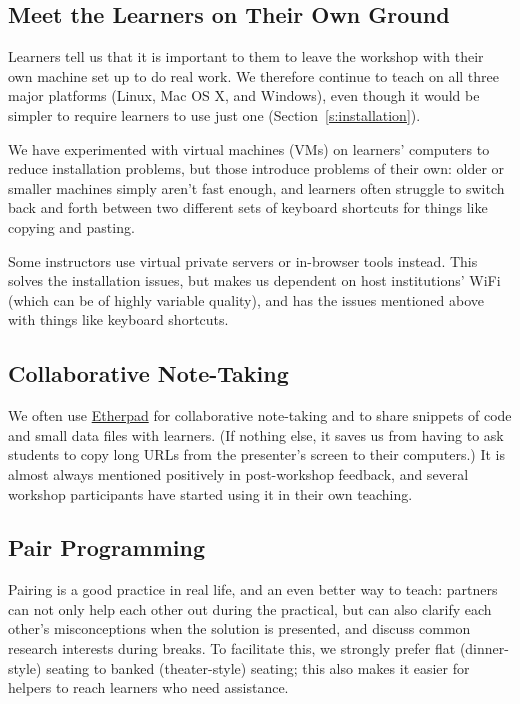 \documentclass[10pt,a4paper,twocolumn]{article}
\begin{document}
\subsection{Meet the Learners on Their Own Ground}

Learners tell us that it is important to them to leave the workshop
with their own machine set up to do real work.  We therefore continue
to teach on all three major platforms (Linux, Mac OS X, and Windows),
even though it would be simpler to require learners to use just one
(Section~\ref{s:installation}).

We have experimented with virtual machines (VMs) on learners'
computers to reduce installation problems, but those introduce
problems of their own: older or smaller machines simply aren't fast
enough, and learners often struggle to switch back and forth between
two different sets of keyboard shortcuts for things like copying and
pasting.

Some instructors use virtual private servers or in-browser tools
instead.  This solves the installation issues, but makes us dependent
on host institutions' WiFi (which can be of highly variable quality),
and has the issues mentioned above with things like keyboard
shortcuts.

\subsection{Collaborative Note-Taking}\label{s:etherpad}

We often use \href{http://etherpad.org}{Etherpad} for collaborative
note-taking and to share snippets of code and small data files with
learners. (If nothing else, it saves us from having to ask students to
copy long URLs from the presenter's screen to their computers.) It is
almost always mentioned positively in post-workshop feedback, and
several workshop participants have started using it in their own
teaching.

\subsection{Pair Programming}

Pairing is a good practice in real life, and an even better way to
teach: partners can not only help each other out during the practical,
but can also clarify each other's misconceptions when the solution is
presented, and discuss common research interests during breaks. To
facilitate this, we strongly prefer flat (dinner-style) seating to
banked (theater-style) seating; this also makes it easier for helpers
to reach learners who need assistance.
\end{document}

